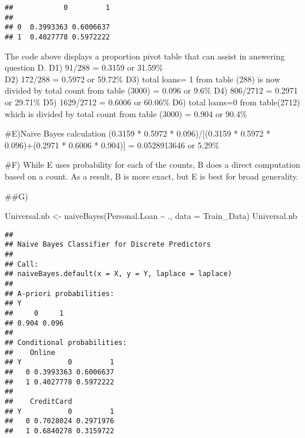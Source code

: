 \documentclass[
]{article}
\newenvironment{Shaded}{\begin{snugshade}}{\end{snugshade}}
\newcommand{\AttributeTok}[1]{\textcolor[rgb]{0.77,0.63,0.00}{#1}}
\newcommand{\DecValTok}[1]{\textcolor[rgb]{0.00,0.00,0.81}{#1}}
\newcommand{\FunctionTok}[1]{\textcolor[rgb]{0.00,0.00,0.00}{#1}}
\newcommand{\NormalTok}[1]{#1}
\newcommand{\OtherTok}[1]{\textcolor[rgb]{0.56,0.35,0.01}{#1}}
\newcommand{\SpecialCharTok}[1]{\textcolor[rgb]{0.00,0.00,0.00}{#1}}
\begin{document}
\begin{Shaded}
\end{Shaded}

\begin{verbatim}
##            0         1
##                       
## 0  0.3993363 0.6006637
## 1  0.4027778 0.5972222
\end{verbatim}

The code above displays a proportion pivot table that can assist in
answering question D. D1) 91/288 = 0.3159 or 31.59\%\\
D2) 172/288 = 0.5972 or 59.72\% D3) total loans= 1 from table (288) is
now divided by total count from table (3000) = 0.096 or 9.6\% D4)
806/2712 = 0.2971 or 29.71\% D5) 1629/2712 = 0.6006 or 60.06\% D6) total
loans=0 from table(2712) which is divided by total count from table
(3000) = 0.904 or 90.4\%

\#E)Naive Bayes calculation (0.3159 * 0.5972 * 0.096)/{[}(0.3159 *
0.5972 * 0.096)+(0.2971 * 0.6006 * 0.904){]} = 0.0528913646 or 5.29\%

\#F) While E uses probability for each of the counts, B does a direct
computation based on a count. As a result, B is more exact, but E is
best for broad generality.

\#\#G)

\begin{Shaded}
\begin{Highlighting}[]
\NormalTok{Universal.nb }\OtherTok{\textless{}{-}} \FunctionTok{naiveBayes}\NormalTok{(Personal.Loan }\SpecialCharTok{\textasciitilde{}}\NormalTok{ ., }\AttributeTok{data =}\NormalTok{ Train\_Data)}
\NormalTok{Universal.nb}
\end{Highlighting}
\end{Shaded}

\begin{verbatim}
## 
## Naive Bayes Classifier for Discrete Predictors
## 
## Call:
## naiveBayes.default(x = X, y = Y, laplace = laplace)
## 
## A-priori probabilities:
## Y
##     0     1 
## 0.904 0.096 
## 
## Conditional probabilities:
##    Online
## Y           0         1
##   0 0.3993363 0.6006637
##   1 0.4027778 0.5972222
## 
##    CreditCard
## Y           0         1
##   0 0.7028024 0.2971976
##   1 0.6840278 0.3159722
\end{verbatim}
\end{document}
